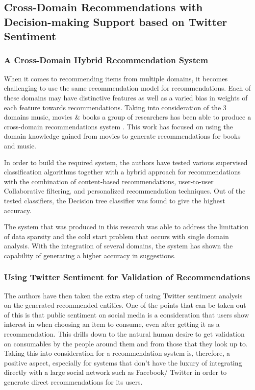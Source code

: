 \documentclass[manuscript,screen,review]{acmart}
\begin{document}
\subsection{Cross-Domain Recommendations with Decision-making Support based on Twitter Sentiment}
\subsubsection{A Cross-Domain Hybrid Recommendation System}
When it comes to recommending items from multiple domains, it becomes challenging to use the same recommendation model for recommendations. Each of these domains may have distinctive features as well as a varied bias in weights of each feature towards recommendations.
Taking into consideration of the 3 domains music, movies \& books a group of researchers has been able to produce a cross-domain recommendations system \cite{ayushi_cross-domain_2018}. This work has focused on using the domain knowledge gained from movies to generate recommendations for books and music.

In order to build the required system, the authors have tested various supervised classification algorithms together with a hybrid approach for recommendations with the combination of content-based recommendations, user-to-user Collaborative filtering, and personalized recommendation techniques. Out of the tested classifiers, the Decision tree classifier was found to give the highest accuracy.

The system that was produced in this research was able to address the limitation of data sparsity and the cold start problem that occurs with single domain analysis. With the integration of several domains, the system has shown the capability of generating a higher accuracy in suggestions.

\subsubsection{Using Twitter Sentiment for Validation of Recommendations}
The authors have then taken the extra step of using Twitter sentiment analysis on the generated recommended entities. One of the points that can be taken out of this is that public sentiment on social media is a consideration that users show interest in when choosing an item to consume, even after getting it as a recommendation. This drills down to the natural human desire to get validation on consumables by the people around them and from those that they look up to. Taking this into consideration for a recommendation system is, therefore, a positive aspect, especially for systems that don't have the luxury of integrating directly with a large social network such as Facebook/ Twitter in order to generate direct recommendations for its users.
\end{document}
